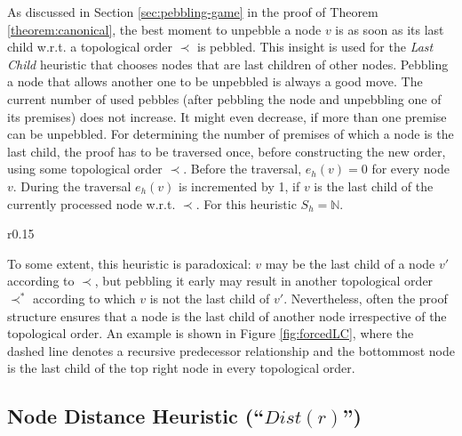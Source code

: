 As discussed in Section \ref{sec:pebbling-game} in the proof of Theorem \ref{theorem:canonical}, the best moment to unpebble a node $v$ is as soon as its last child w.r.t. a topological order $\prec$ is pebbled. 
This insight is used for the \emph{Last Child} heuristic that chooses nodes that are last children of other nodes. 
Pebbling a node that allows another one to be unpebbled is always a good move. 
The current number of used pebbles (after pebbling the node and unpebbling one of its premises) does not increase.
It might even decrease, if more than one premise can be unpebbled.
For determining the number of premises of which a node is the last child, the proof has to be traversed once, before constructing the new order, using some topological order $\prec$.
Before the traversal, $e_h(v) = 0$ for every node $v$. 
During the traversal $e_h(v)$ is incremented by 1, if $v$ is the last child of the currently processed node w.r.t. $\prec$. 
For this heuristic $S_h = \mathbb{N}$.
\begin{wrapfigure}{r}{0.15\textwidth}
	\caption{ }
	\label{fig:forcedLC}
\end{wrapfigure}
To some extent, this heuristic is paradoxical: $v$ may be the last child of a node $v'$ according to $\prec$, but pebbling it early may result in another topological order $\prec^*$ according to which $v$ is not the last child of $v'$.
Nevertheless, often the proof structure ensures that a node is the last child of another node irrespective of the topological order. An example is shown in Figure \ref{fig:forcedLC}, where the dashed line denotes a recursive predecessor relationship and the bottommost node is the last child of the top right node in every topological order.




\subsection{Node Distance Heuristic (``$Dist(r)$'')}
\label{sec:distance}

